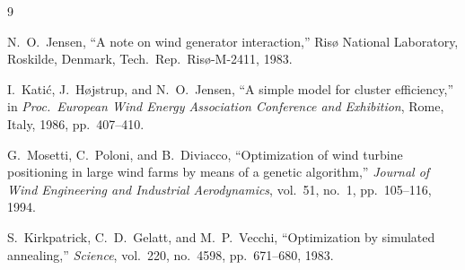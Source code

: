 \documentclass[11pt,a4paper]{article}
\begin{document}
\begin{thebibliography}{9}

N.~O.~Jensen,
``A note on wind generator interaction,''
Ris\o{} National Laboratory, Roskilde, Denmark, Tech.\ Rep.\ Ris\o-M-2411, 1983.

I.~Kati\'c, J.~H\o{}jstrup, and N.~O.~Jensen,
``A simple model for cluster efficiency,''
in \emph{Proc.\ European Wind Energy Association Conference and Exhibition},
Rome, Italy, 1986, pp.~407--410.

G.~Mosetti, C.~Poloni, and B.~Diviacco,
``Optimization of wind turbine positioning in large wind farms by means of a
genetic algorithm,''
\emph{Journal of Wind Engineering and Industrial Aerodynamics},
vol.~51, no.~1, pp.~105--116, 1994.

S.~Kirkpatrick, C.~D.~Gelatt, and M.~P.~Vecchi,
``Optimization by simulated annealing,''
\emph{Science}, vol.~220, no.~4598, pp.~671--680, 1983.

\end{thebibliography}
\end{document}
